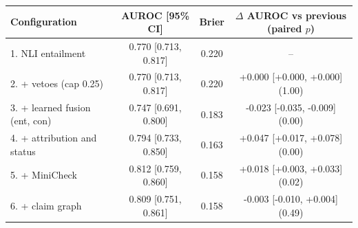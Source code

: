 \begin{tabular}{@{}lccc@{}}
\toprule
Configuration & AUROC [95\% CI] & Brier & $\Delta$ AUROC vs previous (paired $p$) \\
\midrule
1. NLI entailment & 0.770 [0.713, 0.817] & 0.220 & -- \\
2. + vetoes (cap 0.25) & 0.770 [0.713, 0.817] & 0.220 & +0.000 [+0.000, +0.000] (1.00) \\
3. + learned fusion (ent, con) & 0.747 [0.691, 0.800] & 0.183 & -0.023 [-0.035, -0.009] (0.00) \\
4. + attribution and status & 0.794 [0.733, 0.850] & 0.163 & +0.047 [+0.017, +0.078] (0.00) \\
5. + MiniCheck & 0.812 [0.759, 0.860] & 0.158 & +0.018 [+0.003, +0.033] (0.02) \\
6. + claim graph & 0.809 [0.751, 0.861] & 0.158 & -0.003 [-0.010, +0.004] (0.49) \\
\bottomrule
\end{tabular}